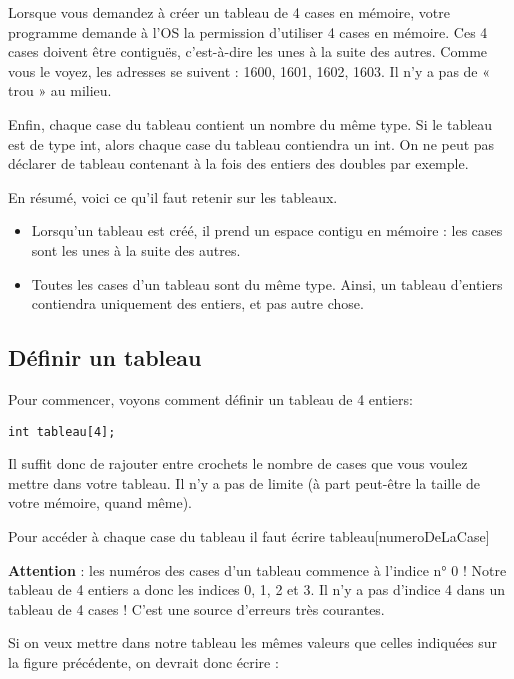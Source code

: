 \documentclass[a4paper, oneside,11pt]{book}
\begin{document}
Lorsque vous demandez \`a cr\'eer un tableau de 4 cases en m\'emoire, votre programme demande \`a l'OS la permission d'utiliser 4 cases en m\'emoire. Ces 4 cases doivent \^etre contiguës, c'est-\`a-dire les unes \`a la suite des autres. Comme vous le voyez, les adresses se suivent : 1600, 1601, 1602, 1603. Il n'y a pas de « trou » au milieu.

Enfin, chaque case du tableau contient un nombre du m\^eme type. Si le tableau est de type int, alors chaque case du tableau contiendra un int. On ne peut pas d\'eclarer de tableau contenant \`a la fois des entiers des doubles par exemple.


En r\'esum\'e, voici ce qu'il faut retenir sur les tableaux.

\begin{itemize}
\item    Lorsqu'un tableau est cr\'e\'e, il prend un espace contigu en m\'emoire : les cases sont les unes \`a la suite des autres.

\item    Toutes les cases d'un tableau sont du m\^eme type. Ainsi, un tableau d'entiers contiendra uniquement des entiers, et pas autre chose.
\end{itemize}   
    
\subsection{D\'efinir un tableau}

Pour commencer, voyons comment d\'efinir un tableau de 4 entiers:

\begin{lstlisting}
int tableau[4];
\end{lstlisting}

Il suffit donc de rajouter entre crochets le nombre de cases que vous voulez mettre dans votre tableau. Il n'y a pas de limite (\`a part peut-\^etre la taille de votre m\'emoire, quand m\^eme).

Pour acc\'eder \`a chaque case du tableau il faut \'ecrire tableau[numeroDeLaCase]

\textbf{Attention} : les num\'eros des cases d'un tableau commence \`a l'indice 
n° 0 ! Notre tableau de 4 entiers a donc les indices 0, 1, 2 et 3. 
Il n'y a pas d'indice 4 dans un tableau de 4 cases ! C'est une source d'erreurs 
tr\`es courantes.

Si on veux mettre dans notre tableau les m\^emes valeurs que celles indiqu\'ees sur la figure pr\'ec\'edente, on devrait donc \'ecrire :
\end{document}
